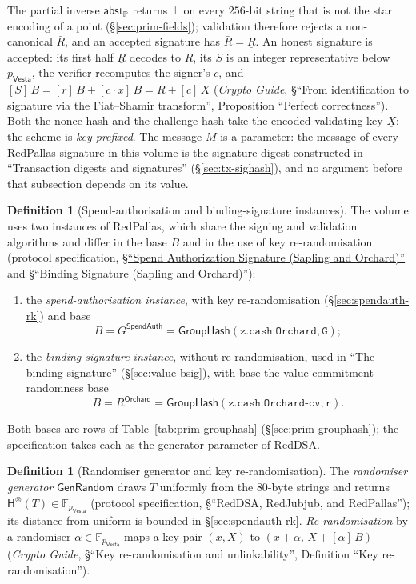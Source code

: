 \documentclass[11pt,a4paper]{article}
\theoremstyle{definition}
\newtheorem{definition}[theorem]{Definition}
\newcommand{\F}{\mathbb{F}}
\newcommand{\PP}{\mathbb{P}}
\newcommand{\Vesta}{\ensuremath{\mathsf{Vesta}}}
\newcommand{\GroupHash}{\ensuremath{\mathsf{GroupHash}}}
\begin{document}
The partial inverse $\mathsf{abst}_{\PP}$ returns $\bot$ on every $256$-bit
string that is not the star encoding of a point (\S\ref{sec:prim-fields});
validation therefore rejects a non-canonical $\bar{R}$, and an accepted
signature has $\bar{R} = \underline{R}$. An honest signature is accepted: its
first half $\underline{R}$ decodes to $R$, its $S$ is an integer
representative below $p_{\Vesta}$, the verifier recomputes the signer's
$c$, and $[S]\,B = [r]\,B + [c \cdot x]\,B = R + [c]\,X$ (\emph{Crypto
Guide}, \S``From identification to signature via the Fiat--Shamir
transform'', Proposition ``Perfect correctness''). Both the nonce hash and the
challenge hash take the encoded validating key $\underline{X}$: the scheme is
\emph{key-prefixed}. The message $M$ is a parameter: the message of every
RedPallas signature in this volume is the signature digest constructed in
``Transaction digests and signatures'' (\S\ref{sec:tx-sighash}), and no
argument before that subsection depends on its value.

\begin{definition}[Spend-authorisation and binding-signature instances]
The volume uses two instances of RedPallas, which share the signing and
validation algorithms and differ in the base $B$ and in the use of key
re-randomisation (protocol specification,
\href{https://zips.z.cash/protocol/protocol.pdf#concretespendauthsig}%
{\S``Spend Authorization Signature (Sapling and Orchard)''} and
\S``Binding Signature (Sapling and Orchard)''):
\begin{enumerate}
\item the \emph{spend-authorisation instance}, with key re-randomisation
  (\S\ref{sec:spendauth-rk}) and base
  \[
    B = G^{\mathsf{SpendAuth}} = \GroupHash(\texttt{z.cash:Orchard},
    \texttt{G});
  \]
\item the \emph{binding-signature instance}, without re-randomisation, used
  in ``The binding signature'' (\S\ref{sec:value-bsig}), with base the
  value-commitment randomness base
  \[
    B = R^{\mathsf{Orchard}} = \GroupHash(\texttt{z.cash:Orchard-cv},
    \texttt{r}).
  \]
\end{enumerate}
Both bases are rows of Table~\ref{tab:prim-grouphash}
(\S\ref{sec:prim-grouphash}); the specification takes each as the generator
parameter of RedDSA.
\end{definition}

\begin{definition}[Randomiser generator and key re-randomisation]
The \emph{randomiser generator} $\mathsf{GenRandom}$ draws $T$ uniformly from
the $80$-byte strings and returns $\mathsf{H}^{\circledast}(T) \in
\F_{p_{\Vesta}}$ (protocol specification, \S``RedDSA, RedJubjub, and
RedPallas''); its distance from uniform is bounded in
\S\ref{sec:spendauth-rk}. \emph{Re-randomisation} by a randomiser
$\alpha \in \F_{p_{\Vesta}}$ maps a key pair $(x, X)$ to
$(x + \alpha,\, X + [\alpha]\,B)$ (\emph{Crypto Guide}, \S``Key
re-randomisation and unlinkability'', Definition ``Key re-randomisation'').
\end{definition}
\end{document}
